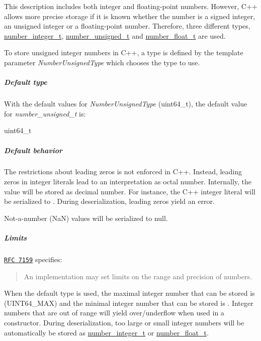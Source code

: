 This description includes both integer and floating-\/point numbers. However, C++ allows more precise storage if it is known whether the number is a signed integer, an unsigned integer or a floating-\/point number. Therefore, three different types, \hyperlink{a00025_ac4b10b2364f26ce47bdb9a413ff04a59}{number\+\_\+integer\+\_\+t}, \hyperlink{a00025_a60a04166c122072ab11eaf9845d9cd1d}{number\+\_\+unsigned\+\_\+t} and \hyperlink{a00025_a74a0013e847fdc574b48f931f0e757e1}{number\+\_\+float\+\_\+t} are used.

To store unsigned integer numbers in C++, a type is defined by the template parameter {\itshape Number\+Unsigned\+Type} which chooses the type to use.

\subparagraph*{Default type}

With the default values for {\itshape Number\+Unsigned\+Type} ({\ttfamily uint64\+\_\+t}), the default value for {\itshape number\+\_\+unsigned\+\_\+t} is\+:


\begin{DoxyCode}
uint64\_t
\end{DoxyCode}


\subparagraph*{Default behavior}


\begin{DoxyItemize}
\item The restrictions about leading zeros is not enforced in C++. Instead, leading zeros in integer literals lead to an interpretation as octal number. Internally, the value will be stored as decimal number. For instance, the C++ integer literal {} will be serialized to {}. During deserialization, leading zeros yield an error.
\item Not-\/a-\/number (NaN) values will be serialized to {\ttfamily null}.
\end{DoxyItemize}

\subparagraph*{Limits}

\href{http://rfc7159.net/rfc7159}{\tt R\+FC 7159} specifies\+: \begin{quote}
An implementation may set limits on the range and precision of numbers. \end{quote}


When the default type is used, the maximal integer number that can be stored is {} (U\+I\+N\+T64\+\_\+\+M\+AX) and the minimal integer number that can be stored is {}. Integer numbers that are out of range will yield over/underflow when used in a constructor. During deserialization, too large or small integer numbers will be automatically be stored as \hyperlink{a00025_ac4b10b2364f26ce47bdb9a413ff04a59}{number\+\_\+integer\+\_\+t} or \hyperlink{a00025_a74a0013e847fdc574b48f931f0e757e1}{number\+\_\+float\+\_\+t}.

